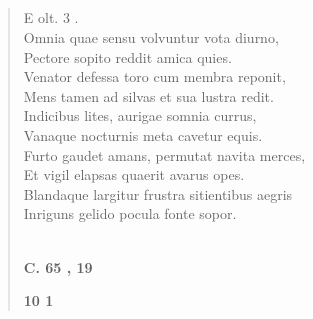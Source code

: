 \documentclass[11pt, a4paper]{report}
\begin{document}
            \subsection*{}
      \begin{verse}
      E olt. 3 . \\ Omnia quae sensu volvuntur vota diurno, \\ Pectore sopito reddit amica quies. \\ Venator defessa toro cum membra reponit, \\ Mens tamen ad silvas et sua lustra redit. \\ Indicibus lites, aurigae somnia currus, \\ Vanaque nocturnis meta cavetur equis. \\ Furto gaudet amans, permutat navita merces, \\ Et vigil elapsas quaerit avarus opes. \\ Blandaque largitur frustra sitientibus aegris \\ Inriguns gelido pocula fonte sopor. \\ 
        ﻿\pagebreak 
    \begin{center} \textbf{C. 65 , 19} \end{center}\begin{center} \textbf{10 1} \end{center}
      \end{verse}
  
\end{document}
